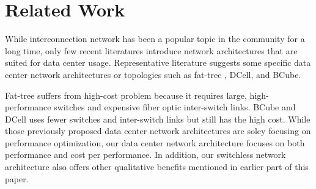 \section{Related Work}
\label{sec:related}

While interconnection network has been a popular topic in the community for a long time\cite{datacenter3}, only few recent literatures introduce network architectures that are suited for data center usage. Representative literature suggests some specific data center network architectures or topologies such as fat-tree \cite{Al-Fares:2008:SCD, datacenter4}, DCell\cite{datacenter2}, and BCube\cite{datacenter5}. 

Fat-tree suffers from high-cost problem because it requires large, high-performance switches and expensive fiber optic inter-switch links. BCube and DCell uses fewer switches and inter-switch links but still has the high cost. While those previously proposed data center network architectures are soley focusing on performance optimization, our data center network architecture focuses on both performance and cost per performance. In addition, our switchless network architecture also offers other qualitative benefits mentioned in earlier part of this paper.